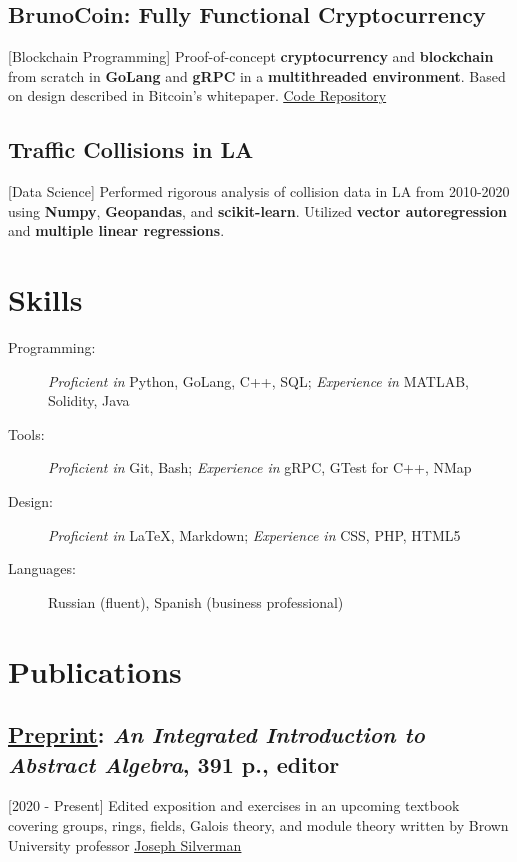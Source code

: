 \documentclass{mycv}
\begin{document}
\subsection{BrunoCoin: Fully Functional Cryptocurrency}[Blockchain Programming]
Proof-of-concept \textbf{cryptocurrency} and \textbf{blockchain} from scratch in \textbf{GoLang} and \textbf{gRPC} in a \textbf{multithreaded environment}. Based on design described in Bitcoin's whitepaper. \href{https://github.com/alizma/BrunoCoin}{\underline{Code Repository}}

\subsection{Traffic Collisions in LA}[Data Science]
Performed rigorous analysis of collision data in LA from 2010-2020 using \textbf{Numpy}, \textbf{Geopandas}, and \textbf{scikit-learn}. Utilized \textbf{vector autoregression} and \textbf{multiple linear regressions}.



\section{Skills}

\begin{description}
  \item[Programming:] \textit{Proficient in} Python, GoLang, C++, SQL; \textit{Experience in} MATLAB, Solidity, Java
  \item[Tools:] \textit{Proficient in} Git, Bash; \textit{Experience in} gRPC, GTest for C++, NMap 
  \item[Design:] \textit{Proficient in} \LaTeX, Markdown; \textit{Experience in} CSS, PHP, HTML5 
  \item[Languages:] Russian (fluent), Spanish (business professional) 

\end{description}


\section{Publications}
\subsection{\underline{Preprint}: \textit{An Integrated Introduction to Abstract Algebra}, 391 p., editor}[2020 - Present] 
Edited exposition and exercises in an upcoming textbook covering groups, rings, fields, Galois theory, and module theory written by Brown University professor \href{http://www.math.brown.edu/johsilve/}{\underline{Joseph Silverman}}
\end{document}

